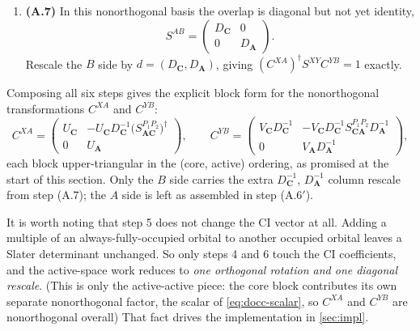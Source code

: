 \documentclass[aip,jcp,preprint]{revtex4-1}
\begin{document}
\begin{enumerate}
in \cref{eq:pcovlp}:
\begin{equation}
 C^{A}_{\mathbf{C}} \equiv C^{P_1}_{\mathbf{C}}, \qquad
 C^{A}_{\mathbf{A}} = C^{P_1}_{\mathbf{A}} - C^{P_1}_{\mathbf{C}} D_{\mathbf{C}}^{-1}
 \big(S^{P_1P_2}_{\mathbf{A}\mathbf{C}}\big)^\dagger,
\end{equation}
\begin{equation}
 C^{B}_{\mathbf{C}} \equiv C^{P_2}_{\mathbf{C}}, \qquad
 C^{B}_{\mathbf{A}} = C^{P_2}_{\mathbf{A}} - C^{P_2}_{\mathbf{C}} D_{\mathbf{C}}^{-1}
 S^{P_1P_2}_{\mathbf{C}\mathbf{A}}.
\end{equation}
\item \textbf{(A.7)} In this nonorthogonal basis the overlap is diagonal but not
yet identity,
\begin{equation}
 S^{AB} = \begin{pmatrix} D_{\mathbf{C}} & 0 \\ 0 & D_{\mathbf{A}} \end{pmatrix}.
\end{equation}
Rescale the $B$ side by $d=(D_{\mathbf{C}},D_{\mathbf{A}})$, giving
$(C^{XA})^\dagger S^{XY} C^{YB}=1$ exactly.
\end{enumerate}

Composing all six steps gives the explicit block form for the nonorthogonal transformations $C^{XA}$ and $C^{YB}$:
\begin{equation}
 C^{XA} = \begin{pmatrix}
 U_{\mathbf{C}} & -U_{\mathbf{C}} D_{\mathbf{C}}^{-1}\big(S^{P_1P_2}_{\mathbf{A}\mathbf{C}}\big)^\dagger \\
 0 & U_{\mathbf{A}}
 \end{pmatrix},
 \qquad
 C^{YB} = \begin{pmatrix}
 V_{\mathbf{C}} D_{\mathbf{C}}^{-1} & -V_{\mathbf{C}} D_{\mathbf{C}}^{-1} S^{P_1P_2}_{\mathbf{C}\mathbf{A}} D_{\mathbf{A}}^{-1} \\
 0 & V_{\mathbf{A}} D_{\mathbf{A}}^{-1}
 \end{pmatrix},
 \label{eq:cxa-cyb}
\end{equation}
each block upper-triangular in the (core, active) ordering, as promised at the
start of this section. Only the $B$ side carries the extra $D_{\mathbf{C}}^{-1}$,
$D_{\mathbf{A}}^{-1}$ column rescale from step (A.7); the $A$ side is left as
assembled in step (A.6$'$).

It is worth noting that step 5 does not change the CI vector at all.
Adding a multiple of an always-fully-occupied orbital to
another occupied orbital leaves a Slater determinant unchanged. 
So only steps 4 and 6 touch the CI coefficients, and the
active-space work reduces to \emph{one orthogonal rotation and one diagonal
rescale}. (This is only the active-active piece: the core block contributes
its own separate nonorthogonal factor, the scalar of \cref{eq:docc-scalar}, so
$C^{XA}$ and $C^{YB}$ are nonorthogonal overall) 
That fact drives the implementation in \cref{sec:impl}.
\end{document}
